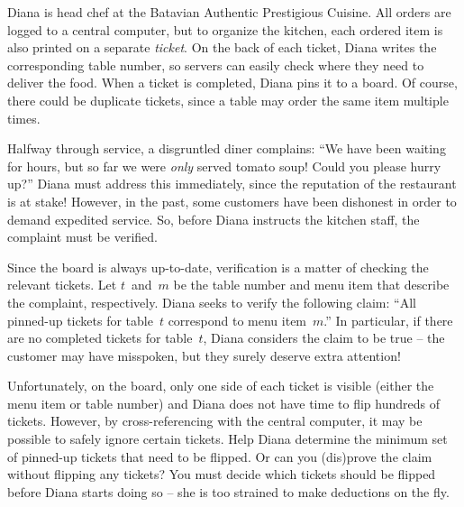 





Diana is head chef at the Batavian Authentic Prestigious Cuisine.
All orders are logged to a central computer, but to organize the kitchen, each ordered item is also printed on a separate \emph{ticket}.
On the back of each ticket, Diana writes the corresponding table number, so servers can easily check where they need to deliver the food.
When a ticket is completed, Diana pins it to a board.
Of course, there could be duplicate tickets, since a table may order the same item multiple times.

Halfway through service, a disgruntled diner complains:
``We have been waiting for hours, but so far we were \emph{only} served tomato soup!
Could you please hurry up?''
Diana must address this immediately, since the reputation of the restaurant is at stake!
However, in the past, some customers have been dishonest in order to demand expedited service.
So, before Diana instructs the kitchen staff, the complaint must be verified.

Since the board is always up-to-date, verification is a matter of checking the relevant tickets.
Let $t$~and~$m$ be the table number and menu item that describe the complaint, respectively.
Diana seeks to verify the following claim: ``All pinned-up tickets for table~$t$ correspond to menu item~$m$.''  %
In particular, if there are no completed tickets for table~$t$, Diana considers the claim to be true --
the customer may have misspoken, but they surely deserve extra attention!  %

Unfortunately, on the board, only one side of each ticket is visible (either the menu item or table number) and Diana does not have time to flip hundreds of tickets.
However, by cross-referencing with the central computer, it may be possible to safely ignore certain tickets.
Help Diana determine the minimum set of pinned-up tickets that need to be flipped.
Or can you (dis)prove the claim without flipping any tickets?
You must decide which tickets should be flipped before Diana starts doing so --
she is too strained to make deductions on the fly.

